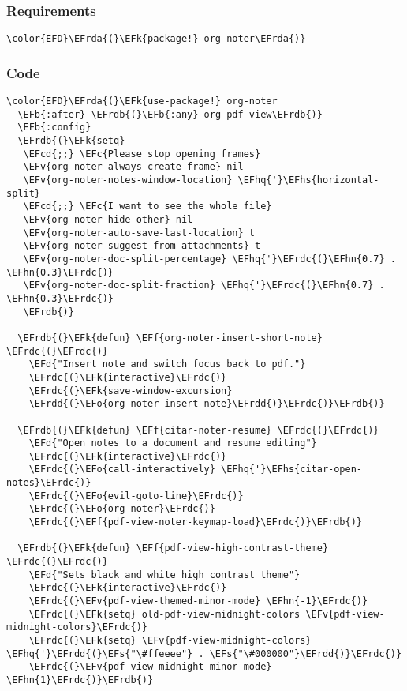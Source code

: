 \documentclass[a4wide,10pt]{article}
\newcommand{\EFc}[1]{\textcolor{EFc}{#1}} %
\newcommand{\EFcd}[1]{\textcolor{EFcd}{#1}} %
\newcommand{\EFs}[1]{\textcolor{EFs}{#1}} %
\newcommand{\EFd}[1]{\textcolor{EFd}{#1}} %
\newcommand{\EFk}[1]{\textcolor{EFk}{#1}} %
\newcommand{\EFb}[1]{\textcolor{EFb}{#1}} %
\newcommand{\EFf}[1]{\textcolor{EFf}{#1}} %
\newcommand{\EFv}[1]{\textcolor{EFv}{#1}} %
\newcommand{\EFo}[1]{\textcolor{EFo}{#1}} %
\newcommand{\EFhn}[1]{\textcolor{EFhn}{\textbf{#1}}} %
\newcommand{\EFhq}[1]{\textcolor{EFhq}{#1}} %
\newcommand{\EFhs}[1]{\textcolor{EFhs}{#1}} %
\newcommand{\EFrda}[1]{\textcolor{EFrda}{#1}} %
\newcommand{\EFrdb}[1]{\textcolor{EFrdb}{#1}} %
\newcommand{\EFrdc}[1]{\textcolor{EFrdc}{#1}} %
\newcommand{\EFrdd}[1]{\textcolor{EFrdd}{#1}} %
\begin{document}
\subsubsection{Requirements}
\label{sec:org6368b13}
\begin{Code}
\begin{Verbatim}
\color{EFD}\EFrda{(}\EFk{package!} org-noter\EFrda{)}
\end{Verbatim}
\end{Code}
\subsubsection{Code}
\label{sec:org7ee8973}
\begin{Code}
\begin{Verbatim}
\color{EFD}\EFrda{(}\EFk{use-package!} org-noter
  \EFb{:after} \EFrdb{(}\EFb{:any} org pdf-view\EFrdb{)}
  \EFb{:config}
  \EFrdb{(}\EFk{setq}
   \EFcd{;;} \EFc{Please stop opening frames}
   \EFv{org-noter-always-create-frame} nil
   \EFv{org-noter-notes-window-location} \EFhq{'}\EFhs{horizontal-split}
   \EFcd{;;} \EFc{I want to see the whole file}
   \EFv{org-noter-hide-other} nil
   \EFv{org-noter-auto-save-last-location} t
   \EFv{org-noter-suggest-from-attachments} t
   \EFv{org-noter-doc-split-percentage} \EFhq{'}\EFrdc{(}\EFhn{0.7} . \EFhn{0.3}\EFrdc{)}
   \EFv{org-noter-doc-split-fraction} \EFhq{'}\EFrdc{(}\EFhn{0.7} . \EFhn{0.3}\EFrdc{)}
   \EFrdb{)}

  \EFrdb{(}\EFk{defun} \EFf{org-noter-insert-short-note} \EFrdc{(}\EFrdc{)}
    \EFd{"Insert note and switch focus back to pdf."}
    \EFrdc{(}\EFk{interactive}\EFrdc{)}
    \EFrdc{(}\EFk{save-window-excursion}
    \EFrdd{(}\EFo{org-noter-insert-note}\EFrdd{)}\EFrdc{)}\EFrdb{)}

  \EFrdb{(}\EFk{defun} \EFf{citar-noter-resume} \EFrdc{(}\EFrdc{)}
    \EFd{"Open notes to a document and resume editing"}
    \EFrdc{(}\EFk{interactive}\EFrdc{)}
    \EFrdc{(}\EFo{call-interactively} \EFhq{'}\EFhs{citar-open-notes}\EFrdc{)}
    \EFrdc{(}\EFo{evil-goto-line}\EFrdc{)}
    \EFrdc{(}\EFo{org-noter}\EFrdc{)}
    \EFrdc{(}\EFf{pdf-view-noter-keymap-load}\EFrdc{)}\EFrdb{)}

  \EFrdb{(}\EFk{defun} \EFf{pdf-view-high-contrast-theme} \EFrdc{(}\EFrdc{)}
    \EFd{"Sets black and white high contrast theme"}
    \EFrdc{(}\EFk{interactive}\EFrdc{)}
    \EFrdc{(}\EFv{pdf-view-themed-minor-mode} \EFhn{-1}\EFrdc{)}
    \EFrdc{(}\EFk{setq} old-pdf-view-midnight-colors \EFv{pdf-view-midnight-colors}\EFrdc{)}
    \EFrdc{(}\EFk{setq} \EFv{pdf-view-midnight-colors} \EFhq{'}\EFrdd{(}\EFs{"\#ffeeee"} . \EFs{"\#000000"}\EFrdd{)}\EFrdc{)}
    \EFrdc{(}\EFv{pdf-view-midnight-minor-mode} \EFhn{1}\EFrdc{)}\EFrdb{)}


\end{Verbatim}
\end{Code}
\end{document}
